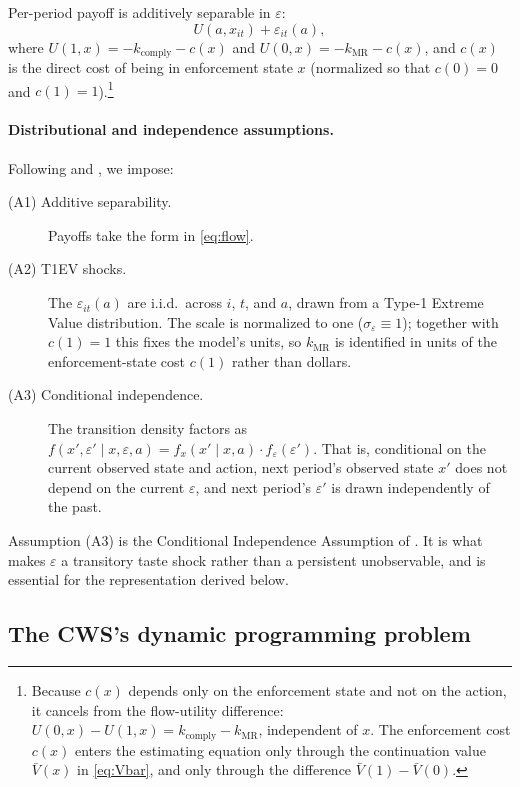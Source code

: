 Per-period payoff is additively separable in $\varepsilon$:
\begin{equation}
U(a, x_{it}) + \varepsilon_{it}(a),
\label{eq:flow}
\end{equation}
where $U(1, x) = -k_{\text{comply}} - c(x)$ and $U(0, x) = -k_{\text{MR}} - c(x)$,
and $c(x)$ is the direct cost of being in enforcement state $x$ (normalized so
that $c(0) = 0$ and $c(1) = 1$).\footnote{Because $c(x)$ depends only on the
enforcement state and not on the action, it cancels from the flow-utility
difference: $U(0, x) - U(1, x) = k_{\text{comply}} - k_{\text{MR}}$,
independent of $x$. The enforcement cost $c(x)$ enters the estimating equation
only through the continuation value $\bar V(x)$ in \eqref{eq:Vbar}, and only
through the difference $\bar V(1) - \bar V(0)$.}

\paragraph{Distributional and independence assumptions.} Following
\citet{rust1987optimal} and \citet{hotz1993conditional}, we impose:
\begin{description}
\item[(A1) Additive separability.] Payoffs take the form in
      \eqref{eq:flow}.
\item[(A2) T1EV shocks.] The $\varepsilon_{it}(a)$ are i.i.d.\ across $i$,
      $t$, and $a$, drawn from a Type-1 Extreme Value distribution. The scale
      is normalized to one ($\sigma_\varepsilon \equiv 1$); together with
      $c(1) = 1$ this fixes the model's units, so $k_{\text{MR}}$ is identified
      in units of the enforcement-state cost $c(1)$ rather than dollars.
\item[(A3) Conditional independence.] The transition density factors as
      $f(x', \varepsilon' \mid x, \varepsilon, a) = f_x(x' \mid x, a)
      \cdot f_\varepsilon(\varepsilon')$. That is, conditional on the current
      observed state and action, next period's observed state $x'$ does not
      depend on the current $\varepsilon$, and next period's $\varepsilon'$ is
      drawn independently of the past.
\end{description}
Assumption (A3) is the Conditional Independence Assumption of
\citet{rust1987optimal}. It is what makes $\varepsilon$ a transitory taste
shock rather than a persistent unobservable, and is essential for the
representation derived below.

\subsection{The CWS's dynamic programming problem}

